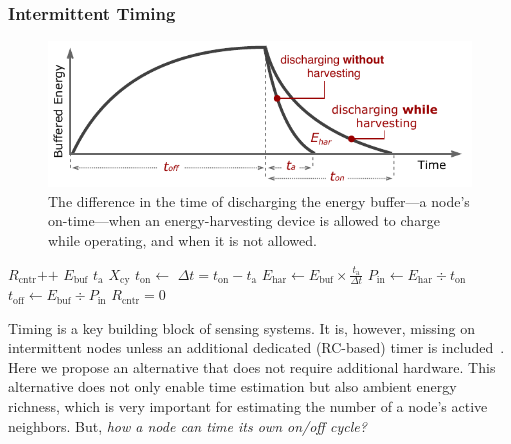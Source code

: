 \subsubsection{Intermittent Timing}
\label{subsec:interTimer}
%
\begin{figure}[t]
		\centering
		\includegraphics[width=\columnwidth]{figures/softwareClock}
		\caption{The difference in the time of discharging the energy buffer---a node's on-time---when an energy-harvesting device is allowed to charge while operating, and when it is not allowed.}
		\label{fig:softwareClock}
\end{figure} 
\begin{algorithm}[t]
    \label{algo:offTime}
    \small
    \begin{algorithmic}[1]
		\State $R_\text{cntr}\text{++}$    \label{lin:i}
		\State $E_\text{buf}$ 
		\State $t_\text{a}$ \label{lin:ta}
		\State$ X_\text{cy} $  
			\State {}  \label{lin:fixedLoad}
			\State $t_\text{on} \leftarrow$  \label{lin:ton}
		\EndIf
			\State \label{lin:deltat}$\Delta{t} = t_\text{on}-t_\text{a}$   \label{lin:td}
			\State \label{lin:ehar}$E_\text{har} \leftarrow E_\text{buf}\times \frac{t_\text{a}}{\Delta{t}}$ 
			\State $P_\text{in} \leftarrow E_\text{har}\div{t_\text{on}}$  \label{lin:pin}
			\State \label{lin:offtime}$t_\text{off} \leftarrow E_\text{buf}\div P_\text{in}$ 
			\State $R_\text{cntr}=0$
		\EndIf
	\end{algorithmic}
\end{algorithm}
%
Timing is a key building block of sensing systems. It is, however, missing on intermittent nodes unless an additional dedicated (RC-based) timer is included~\cite{hester2017timely}. Here we propose an alternative that does not require additional hardware. This alternative does not only enable time estimation but also ambient energy richness, which is very important for estimating the number of a node's active neighbors. But, \textit{how a node can time its own on/off cycle?}


